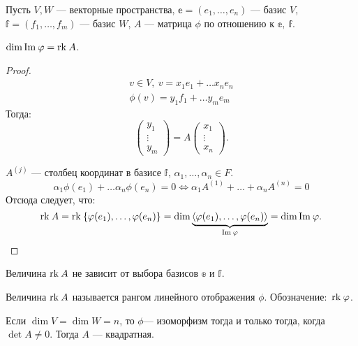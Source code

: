 Пусть $V, W$ --- векторные пространства, $\mathbb{e} = (e_1, \ldots, e_n)$ --- базис $V$, $\mathbb{f} = (f_1, \ldots, f_m)$ --- базис $W$, $A$ --- матрица $\phi$ по отношению к $\mathbb{e},\ \mathbb{f}$.

\begin{Suggestion}
    $\dim \mathrm{Im\:} \varphi = \mathrm{rk}\: A$.
\end{Suggestion}

\begin{proof}
    \begin{gather*}
        v \in V,\ v = x_1e_1 + \ldots x_ne_n\\
        \phi(v) = y_1f_1 + \ldots y_me_m 
    \end{gather*}
    Тогда:
    $$
    \begin{pmatrix}
        y_1\\
        \vdots\\
        y_m
    \end{pmatrix}
    = A \begin{pmatrix}
        x_1\\
        \vdots\\
        x_n
    \end{pmatrix}.
    $$
   \par  $A^{\left(j\right)}$ --- столбец координат в базисе $\mathbb{f}$, $\alpha_1, \ldots, \alpha_n \in F$.
   \[
        \alpha_1 \phi(e_1) + \ldots \alpha_n \phi(e_n) = 0 \Leftrightarrow \alpha_1 A^{\left(1\right)} + \ldots + \alpha_n A^{\left(n\right)} = 0
   \]
   Отсюда следует, что:
   \[
        \mathrm{rk}\: A = \mathrm{rk}\:\{\varphi(e_1), \ldots, \varphi(e_n)\} = \dim \underbrace{\langle\varphi(e_1), \ldots, \varphi(e_n)\rangle}_{\mathrm{Im\:}\varphi} = \dim \mathrm{Im\:} \varphi.
   \]
\end{proof}

\begin{Consequence}
    Величина $\mathrm{rk}\: A$ не зависит от выбора базисов $\mathbb{e}$ и $\mathbb{f}$.
\end{Consequence}

\begin{Def}
    Величина $\mathrm{rk}\: A$ называется рангом линейного отображения $\phi$. Обозначение:~$\mathrm{rk}\: \varphi$.
\end{Def}

\begin{Consequence}
    Если $\dim V = \dim W = n$, то $\phi$--- изоморфизм тогда и только тогда, когда $\det A \neq 0$. Тогда $A$ --- квадратная.
\end{Consequence}


